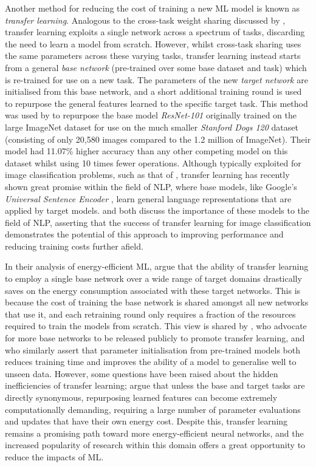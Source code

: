 \documentclass[a4paper, 12pt]{article}
\begin{document}
    Another method for reducing the cost of training a new ML model is known as \emph{transfer learning}. Analogous to the cross-task weight sharing discussed by \citet{xu-2021}, transfer learning exploits a single network across a spectrum of tasks, discarding the need to learn a model from scratch. However, whilst cross-task sharing uses the same parameters across these varying tasks, transfer learning instead starts from a general \emph{base network} (pre-trained over some base dataset and task) which is re-trained for use on a new task. The parameters of the new \emph{target network} are initialised from this base network, and a short additional training round is used to repurpose the general features learned to the specific target task. This method was used by \citet{wang-2020} to repurpose the base model \emph{ResNet-101} \citep{he-2015} originally trained on the large ImageNet dataset for use on the much smaller \emph{Stanford Dogs 120} dataset (consisting of only 20,580 images compared to the 1.2 million of ImageNet). Their model had 11.07\% higher accuracy than any other competing model on this dataset whilst using 10 times fewer operations. Although typically exploited for image classification problems, such as that of \citet{wang-2020}, transfer learning has recently shown great promise within the field of NLP, where base models, like Google's \emph{Universal Sentence Encoder} \citep{cer-2018}, learn general language representations that are applied by target models. \citet{ruder-2018} and \citet{conneau-2017} both discuss the importance of these models to the field of NLP, asserting that the success of transfer learning for image classification demonstrates the potential of this approach to improving performance and reducing training costs further afield.

    In their analysis of energy-efficient ML, \citet{sharma-kaulgud-2021} argue that the ability of transfer learning to employ a single base network over a wide range of target domains drastically saves on the energy consumption associated with these target networks. This is because the cost of training the base network is shared amongst all new networks that use it, and each retraining round only requires a fraction of the resources required to train the models from scratch. This view is shared by \citet{schwartz-2019}, who advocate for more base networks to be released publicly to promote transfer learning, and \citet{xu-2021} who similarly assert that parameter initialisation from pre-trained models both reduces training time and improves the ability of a model to generalise well to unseen data. However, some questions have been raised about the hidden inefficiencies of transfer learning; \citet{strubell-2019} argue that unless the base and target tasks are directly synonymous, repurposing learned features can become extremely computationally demanding, requiring a large number of parameter evaluations and updates that have their own energy cost. Despite this, transfer learning remains a promising path toward more energy-efficient neural networks, and the increased popularity of research within this domain offers a great opportunity to reduce the impacts of ML.
\end{document}
